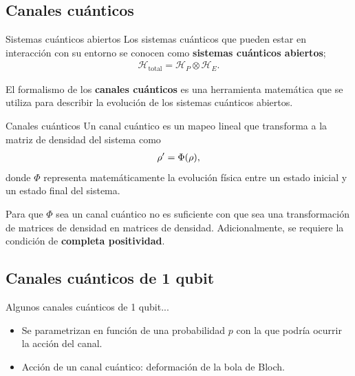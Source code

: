 \documentclass[11pt,xcolor=dvipsnames]{beamer}
\begin{document}
\subsection{Canales cuánticos}
\begin{frame}{Sistemas cuánticos abiertos}
	Los sistemas cuánticos que pueden estar en interacción con su 
	entorno se conocen como \textbf{sistemas cuánticos abiertos};\pause
	\begin{align*}
		\mathcal{H}_{\text{total}}=\mathcal{H}_P\otimes \mathcal{H}_E.
	\end{align*}\pause
	
	El formalismo de los \textbf{canales cuánticos} es una herramienta matemática
	que se utiliza para describir la evolución de los sistemas cuánticos abiertos. 
	\begin{figure}
	\centering
	\end{figure}
\end{frame}


\begin{frame}{Canales cuánticos}
	Un canal cuántico es un mapeo lineal que transforma a la matriz de 
	densidad del sistema como
	\begin{align*}
		\rho ' = \Phi \qty(\rho),
	\end{align*}
	donde $\Phi$ representa matemáticamente la evolución física entre 
	un estado inicial y un estado final del sistema.\vfill \pause
	
	Para que $\Phi$ sea un canal cuántico no es suficiente con que sea una
	transformación de matrices de densidad en	matrices de densidad. 
	Adicionalmente, se requiere la condición de	\textbf{completa positividad}.
\end{frame}



\subsection{Canales cuánticos de 1 qubit}

\begin{frame}
	\centering
	{\LARGE
	Algunos canales cuánticos de 1 qubit...}\vfill
	
	\begin{itemize}[label=$\textcolor{Blue}{\blacktriangleright}$]
		\item Se parametrizan en función de una probabilidad $p$ con la que 
					podría ocurrir la acción del canal.
		\item Acción de un canal cuántico: deformación de la bola de Bloch.
	\end{itemize}
\end{frame}
\end{document}
